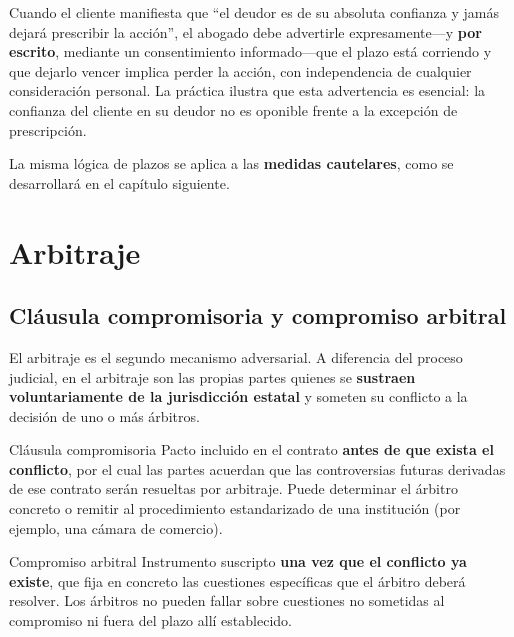 \documentclass[12pt,oneside]{book}
\begin{document}
\begin{important}
Cuando el cliente manifiesta que ``el deudor es de su absoluta
confianza y jamás dejará prescribir la acción'', el abogado debe
advertirle expresamente---y \textbf{por escrito}, mediante un
consentimiento informado---que el plazo está corriendo y que dejarlo
vencer implica perder la acción, con independencia de cualquier
consideración personal. La práctica ilustra que esta advertencia
es esencial: la confianza del cliente en su deudor no es oponible
frente a la excepción de prescripción.
\end{important}

La misma lógica de plazos se aplica a las \textbf{medidas cautelares},
como se desarrollará en el capítulo siguiente.

\chapter{Arbitraje}

\section{Cl\'ausula compromisoria y compromiso arbitral}

El arbitraje es el segundo mecanismo adversarial. A diferencia del
proceso judicial, en el arbitraje son las propias partes quienes se
\textbf{sustraen voluntariamente de la jurisdicción estatal} y someten
su conflicto a la decisión de uno o más árbitros.

\begin{definition}{Cl\'ausula compromisoria}
Pacto incluido en el contrato \textbf{antes de que exista el conflicto},
por el cual las partes acuerdan que las controversias futuras derivadas
de ese contrato serán resueltas por arbitraje. Puede determinar el
árbitro concreto o remitir al procedimiento estandarizado de una
institución (por ejemplo, una cámara de comercio).
\end{definition}

\begin{definition}{Compromiso arbitral}
Instrumento suscripto \textbf{una vez que el conflicto ya existe}, que
fija en concreto las cuestiones específicas que el árbitro deberá
resolver. Los árbitros no pueden fallar sobre cuestiones no sometidas
al compromiso ni fuera del plazo allí establecido.
\end{definition}
\end{document}
